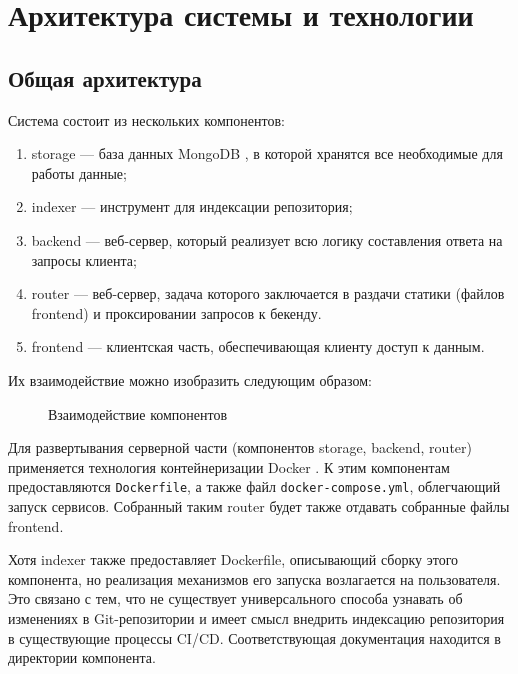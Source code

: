 \chapter{Архитектура системы и технологии}
\label{chap:architecture}

\section{Общая архитектура}

Система состоит из нескольких компонентов:

\begin{enumerate}
    \item storage — база данных MongoDB \cite{chodorow2010mongodb}, в которой хранятся все необходимые для работы данные;
    \item indexer — инструмент для индексации репозитория;
    \item backend — веб-сервер, который реализует всю логику составления ответа на запросы клиента;
    \item router — веб-сервер, задача которого заключается в раздачи статики (файлов frontend) и проксировании запросов к бекенду.
    \item frontend — клиентская часть, обеспечивающая клиенту доступ к данным. 
\end{enumerate}

Их взаимодействие можно изобразить следующим образом:

\begin{figure}[H]
    \centering
    
    \caption{Взаимодействие компонентов}
\end{figure}

Для развертывания серверной части (компонентов storage, backend, router) применяется технология контейнеризации Docker \cite{dockerbook}. К этим компонентам предоставляются \texttt{Dockerfile}, а также файл \texttt{docker-compose.yml}, облегчающий запуск сервисов. Собранный таким router будет также отдавать собранные файлы frontend.

Хотя indexer также предоставляет Dockerfile, описывающий сборку этого компонента, но реализация механизмов его запуска возлагается на пользователя. Это связано с тем, что не существует универсального способа узнавать об изменениях в Git-репозитории и имеет смысл внедрить индексацию репозитория в существующие процессы CI/CD. Соответствующая документация находится в директории компонента.

